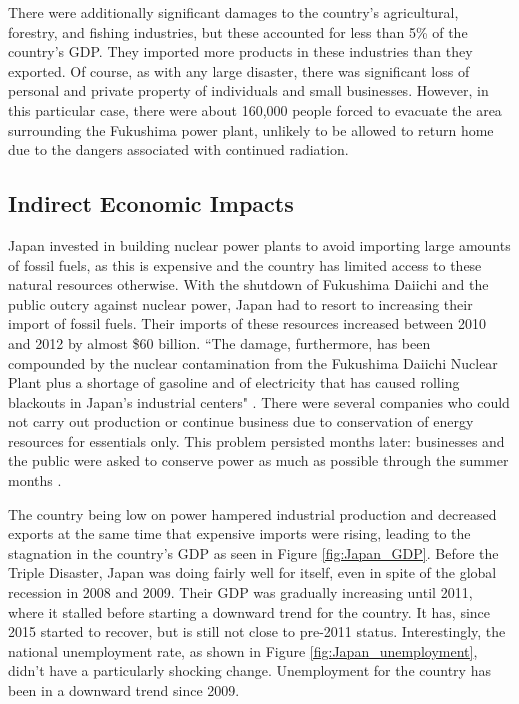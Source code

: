 \documentclass[%
 reprint,
 amsmath,amssymb,
 aps,
]{revtex4-1}
\begin{document}
There were additionally significant damages to the country's agricultural, forestry, and fishing industries, but these accounted for less than 5\% of the country's GDP. They imported more products in these industries than they exported. \cite{nanto_2011} Of course, as with any large disaster, there was significant loss of personal and private property of individuals and small businesses. However, in this particular case, there were about 160,000 people forced to evacuate the area surrounding the Fukushima power plant, unlikely to be allowed to return home due to the dangers associated with continued radiation. \cite{mccurry_2017}

\subsection{\label{sec:level2} Indirect Economic Impacts}

Japan invested in building nuclear power plants to avoid importing large amounts of fossil fuels, as this is expensive and the country has limited access to these natural resources otherwise. With the shutdown of Fukushima Daiichi and the public outcry against nuclear power, Japan had to resort to increasing their import of fossil fuels. Their imports of these resources increased between 2010 and 2012 by almost \$60 billion. \cite{harlan_2012} ``The damage, furthermore, has been compounded by the nuclear contamination from the Fukushima Daiichi Nuclear Plant plus a shortage of gasoline and of electricity that has caused rolling blackouts in Japan's industrial centers" \cite{nanto_2011}. There were several companies who could not carry out production or continue business due to conservation of energy resources for essentials only. This problem persisted months later: businesses and the public were asked to conserve power as much as possible through the summer months \cite{rubin_2011}.

The country being low on power hampered industrial production and decreased exports at the same time that expensive imports were rising, leading to the stagnation in the country's GDP as seen in Figure \ref{fig:Japan_GDP}. Before the Triple Disaster, Japan was doing fairly well for itself, even in spite of the global recession in 2008 and 2009. Their GDP was gradually increasing until 2011, where it stalled before starting a downward trend for the country. It has, since 2015 started to recover, but is still not close to pre-2011 status. Interestingly, the national unemployment rate, as shown in Figure \ref{fig:Japan_unemployment}, didn't have a particularly shocking change. Unemployment for the country has been in a downward trend since 2009.
\end{document}
